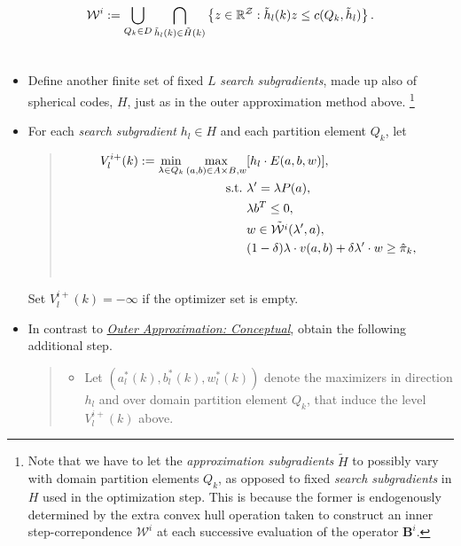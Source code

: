 \documentclass[a4paper,10pt,english]{sphinxmanual}
\begin{document}
\begin{gather}
\begin{split}\mathcal{W}^{i} := \bigcup_{Q_k \in D}  \bigcap_{\tilde{h}_l (k) \in \tilde{H}(k)}
\left\{ z \in \mathbb{R}^{\mathcal{Z}} :
\tilde{h}_l (k) z \leq c(Q_k,\tilde{h}_l) \right\}.\end{split}\notag\\\begin{split}\end{split}\notag
\end{gather}\begin{itemize}
\item {} 
Define another finite set of fixed $L$ \emph{search subgradients}, made up also of
spherical codes, $H$, just as in the outer approximation method above. \footnote{
Note that we have to let the \emph{approximation subgradients} $\tilde{H}$ to possibly vary with domain partition elements $Q_k$, as opposed to fixed \emph{search subgradients} in $H$ used in the optimization step. This is because the former is endogenously determined by the extra convex hull operation taken to construct an inner step-correpondence $\mathcal{W}^{i}$ at each successive evaluation of the operator $\mathbf{B}^i$.
}

\item {} 
For each \emph{search subgradient} $h_l\in H$ and each partition element
$Q_k$, let
\begin{quote}
\label{payoff_compute:equation-InnerBLP}\begin{gather}
\begin{split}V^{i+}_l(k):=\min_{\lambda\in Q_k} \max_{(a,b) \in A \times B, w}& [h_l \cdot E(a,b,w)],
\\
\text{s.t.}\,\,&\lambda'=\lambda P(a),
\\
& \lambda b^T \leq 0,
\\
& w\in \tilde{\mathcal{W}^i}(\lambda',a),
\\
& (1-\delta)\lambda \cdot v(a,b)+\delta \lambda' \cdot w\geq \hat{\pi}_k,\end{split}\label{payoff_compute-InnerBLP}\\\begin{split}\end{split}\notag
\end{gather}\end{quote}

Set $V^{i+}_l(k) = -\infty$ if the optimizer set is empty.

\item {} 
In contrast to {\hyperref[payoff_compute:outer-concept]{\emph{Outer Approximation: Conceptual}}}, obtain the following additional
step.
\begin{quote}
\begin{itemize}
\item {} 
Let $(a_{l}^{\ast}(k), b_{l}^{\ast}(k), w_{l}^{\ast}(k))$ denote the maximizers in direction $h_l$ and over domain partition element $Q_k$, that induce the level $V^{i+}_l(k)$ above.


\end{itemize}
\end{quote}
\end{itemize}
\end{document}
